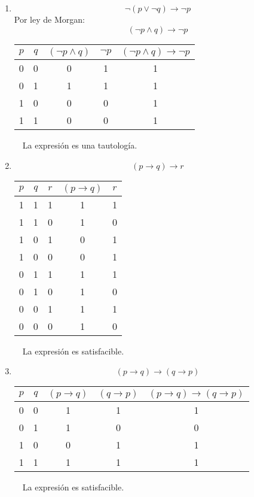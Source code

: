 \documentclass[11pt]{utalcaDoc}
\begin{document}
\subsection{ } %
\begin{enumerate}


\item
\[ \neg(p \lor \neg q) \to \neg p \]
Por ley de Morgan:
\[ (\neg p \wedge q) \to \neg p\]
\begin{tabular}{|c|c||c|c|c|}
\hline 
$p$ & \textbf{$q$} & \textbf{$(\neg p \wedge q)$} & \textbf{$\neg p$} &\textbf{$ (\neg p \wedge q) \to \neg p $} \\ 
\hline 
0 & 0 & 0 & 1 & 1 \\ 
\hline 
0 & 1 & 1 & 1 & 1 \\ 
\hline 
1 & 0 & 0 & 0 & 1 \\ 
\hline 
1 & 1 & 0 & 0 & 1 \\ 
\hline
\end{tabular} \ \ 
La expresión es una tautología.

\item  
\[ (p \to q) \to r\]
\begin{tabular}{|c|c|c||c|c|}
\hline 
$p$ & $q$ & $r$ & $(p \to q)$ &  $r$\\ 
\hline 
1 & 1 & 1 & 1 & 1 \\ 
\hline 
1 & 1 & 0 & 1 & 0 \\ 
\hline 
1 & 0 & 1 & 0 & 1 \\ 
\hline 
1 & 0 & 0 & 0 & 1 \\ 
\hline 
0 & 1 & 1 & 1 & 1 \\ 
\hline 
0 & 1 & 0 & 1 & 0 \\ 
\hline 
0 & 0 & 1 & 1 & 1 \\ 
\hline 
0 & 0 & 0 & 1 & 0 \\ 
\hline 
\end{tabular} \ \
La expresión es satisfacible.


\item
\[ (p \to q) \to (q \to p)\]

\begin{tabular}{|c|c||c|c|c|}
\hline
$p$ & $q$ & $(p \to q)$ & $(q \to p)$ & $(p \to q) \to (q \to p)$ \\
\hline 
0 & 0 & 1 & 1 & 1 \\ 
\hline 
0 & 1 & 1 & 0 & 0 \\ 
\hline 
1 & 0 & 0 & 1 & 1 \\ 
\hline 
1 & 1 & 1 & 1 & 1 \\  
\hline 
\end{tabular} \ \
La expresión es satisfacible.


\end{enumerate}
\end{document}
